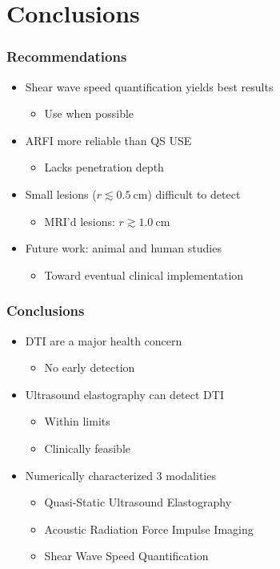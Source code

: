 \documentclass{beamer}
\begin{document}
	\section{Conclusions}
		\begin{frame}
			\frametitle{Recommendations}
			\begin{itemize}
				\item \alert{Shear wave speed quantification} yields best results
				\begin{itemize}
					\item Use when possible
				\end{itemize}
				\item ARFI more reliable than QS USE
				\begin{itemize}
					\item Lacks penetration depth
				\end{itemize}
				\item Small lesions ($r \lesssim \SI{0.5}{\cm}$) difficult to detect
				\begin{itemize}
					\item MRI'd lesions: $r \gtrsim \SI{1.0}{\cm}$
				\end{itemize}
				\item Future work: \alert{animal} and \alert{human} studies
				\begin{itemize}
					\item Toward eventual clinical implementation
				\end{itemize}
			\end{itemize}
		\end{frame}

		\begin{frame}
			\frametitle{Conclusions}
			\begin{itemize}
				\item DTI are a major health concern
				\begin{itemize}
					\item No early detection
				\end{itemize}
				\item Ultrasound elastography \alert{can} detect DTI
				\begin{itemize}
					\item Within limits
					\item Clinically feasible
				\end{itemize}
				\item Numerically characterized 3 modalities
				\begin{itemize}
					\item Quasi-Static Ultrasound Elastography
					\item Acoustic Radiation Force Impulse Imaging
					\item Shear Wave Speed Quantification 
				\end{itemize}
			\end{itemize}
		\end{frame}
		
\end{document}
